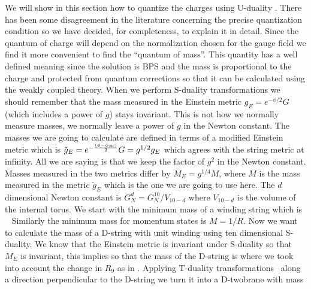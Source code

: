 


We will show in this section how to quantize the 
charges using U-duality \hull . There has been some disagreement
in the literature concerning the precise quantization condition 
so  we have decided, for completeness, to explain it in detail.
Since the quantum of charge
will depend on the normalization chosen for the gauge 
field we find it more convenient to find the 
``quantum of mass''. This quantity has a well defined
meaning  since the solution is BPS and the mass is proportional
to the charge and 
protected from quantum corrections so that it can
be calculated using the weakly coupled theory. 
When we perform S-duality transformations
we should remember that the mass measured in 
the Einstein metric $ g_E = e^{ - { \phi /2 } } G $
(which includes a power of $g$) stays invariant. This is not 
how  we normally measure masses,
 we normally leave a power of $g$
in the Newton constant. 
 The masses we are going to calculate
are defined in terms of a modified Einstein metric which
is $ \tilde g_E = e^{ - { ( \phi -\phi_\infty )\over 2   } }
G = g^{1/2} g_E $ which agrees with the string metric at 
infinity. All we are saying is 
 that we keep the factor of $g^2$ in the Newton
constant.  Masses measured in the two metrics differ by
$M_E = g^{1/4} M $, where $M$ is the mass measured 
in the metric $\tilde g_E $ which is the one we are
going to use here. 
 The $d$ dimensional Newton
constant is $G_N^d = G_N^{10}/V_{10-d}$ where
$V_{10-d}$ is the volume of the internal torus.
We start with the minimum mass of a winding string which is
\virasoro\ 
\eqn{}
Similarly the minimum mass for momentum states is $M = 1/R $.
Now we want to calculate the mass of a D-string with unit
winding using ten dimensional S-duality.
 We know that the Einstein metric is
invariant under S-duality so that $M_E$ is invariant,
this implies 
\eqn{}so that
the mass  of the D-string is
\eqn{}
where we took into account the change in $R_9$ as in \sduality .
Applying T-duality transformations \tduality\ along a direction
perpendicular to the D-string we turn it into a D-twobrane
with mass
\eqn{}

